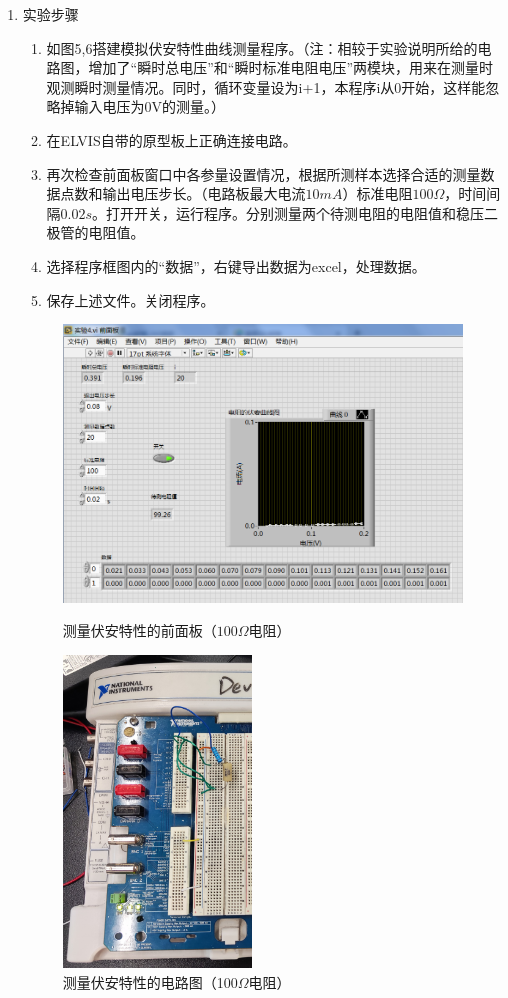 \documentclass[UTF8]{article}
\begin{document}
\begin{enumerate}
    \item 实验步骤
    \begin{enumerate}
        \item 如图5,6搭建模拟伏安特性曲线测量程序。（注：相较于实验说明所给的电路图，增加了“瞬时总电压”和“瞬时标准电阻电压”两模块，用来在测量时观测瞬时测量情况。同时，循环变量设为i+1，本程序i从0开始，这样能忽略掉输入电压为0V的测量。）
        \item 在ELVIS自带的原型板上正确连接电路。
        \item 再次检查前面板窗口中各参量设置情况，根据所测样本选择合适的测量数据点数和输出电压步长。（电路板最大电流$10mA$）标准电阻$100\Omega$，时间间隔$0.02s$。打开开关，运行程序。分别测量两个待测电阻的电阻值和稳压二极管的电阻值。
        \item 选择程序框图内的“数据”，右键导出数据为excel，处理数据。
        \item 保存上述文件。关闭程序。
    \end{enumerate}
    \begin{figure}[H]
        \begin{minipage}[t]{0.69\linewidth}
            \centering
            \includegraphics[width=11.5cm]{Fig/6.png}
            \caption{测量伏安特性的前面板（$100\Omega$电阻）}
        \end{minipage}
        \begin{minipage}[t]{0.3\linewidth}
            \centering
            \includegraphics[width=5cm]{Fig/7.jpg}
            \caption{测量伏安特性的电路图（100$\Omega$电阻）}
        \end{minipage}
       

\end{figure}
\end{enumerate}
\end{document}
